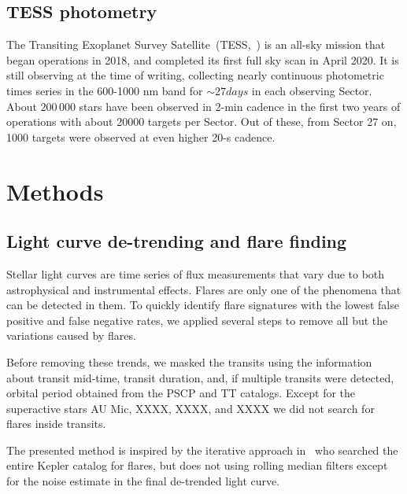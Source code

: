 \documentclass[fleqn,usenatbib,letters]{mnras}%
\begin{document}
\subsection{TESS photometry}
The Transiting Exoplanet Survey Satellite~(TESS,~\citealt{ricker2014}) is an all-sky mission that began operations in 2018, and completed its first full sky scan in April 2020. It is still observing at the time of writing, collecting nearly continuous photometric times series in the 600-1000 nm band for $\sim 27 days$ in each observing Sector. About $200\,000$ stars have been observed in 2-min cadence in the first two years of operations with about 20000 targets per Sector. Out of these, from Sector 27 on, 1000 targets were observed at even higher 20-s cadence. 


\section{Methods}
\subsection{Light curve de-trending and flare finding}
Stellar light curves are time series of flux measurements that vary due to both astrophysical and instrumental effects. Flares are only one of the phenomena that can be detected in them. To quickly identify flare signatures with the lowest false positive and false negative rates, we applied several steps to remove all but the variations caused by flares.

Before removing these trends, we masked the transits using the information about transit mid-time, transit duration, and, if multiple transits were detected, orbital period obtained from the PSCP and TT catalogs. Except for the superactive stars AU Mic, XXXX, XXXX, and XXXX we did not search for flares inside transits. %

The presented method is inspired by the iterative approach in~\citet{davenport2016} who searched the entire Kepler catalog for flares, but does not using rolling median filters except for the noise estimate in the final de-trended light curve. 
\end{document}
